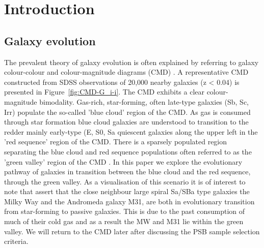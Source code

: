 \section{Introduction}
\label{sec:introduction}

\subsection{Galaxy evolution}
\label{sec:evolution}

The prevalent theory of galaxy evolution is often explained  by  referring to galaxy colour-colour and colour-magnitude diagrams (CMD) \citep[see e.g.][]{2001AJ....122.1861S, 2003ApJ...585L...5H, 2003ApJS..149..289B,baldry2004quantifying,2006MNRAS.373..469B, }. A representative CMD constructed from SDSS observations of 20,000 nearby galaxies (z < 0.04)  is presented in  Figure~\ref{fig:CMD-G_i-i}. The CMD exhibits a clear colour-magnitude bimodality.  Gas-rich, star-forming, often late-type galaxies (Sb, Sc, Irr) populate the so-called 'blue cloud' region of the CMD. As gas is consumed through star formation blue cloud galaxies are understood to transition to the redder mainly early-type (E, S0, Sa  quiescent galaxies along the upper left in the 'red sequence' region of the CMD. There is a sparsely populated region separating the blue cloud and red sequence populations often referred to as the 'green valley' region of the CMD \citep{2004ApJ...608..752B}. In this paper we explore the evolutionary pathway of galaxies in transition between the blue cloud and the red sequence, through the green valley.
As a visualisation of this scenario it is of interest to note that \citet{Mutch_2011} assert that the close neighbour large spiral Sa/SBa type galaxies the Milky Way and the Andromeda galaxy M31, are both in evolutionary transition from star-forming to passive galaxies. This is due to the past consumption of much of their cold gas and as a result the MW and M31 lie within the green valley. We will return to the CMD later after discussing the PSB sample selection criteria.


